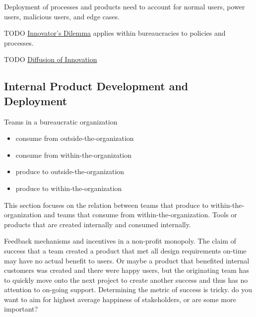 Deployment of processes and products need to account for 
normal users, power users, malicious users, and edge cases.

TODO
\href{https://en.m.wikipedia.org/wiki/The_Innovator's_Dilemma}{Innovator's Dilemma} applies within bureaucracies to policies and processes.

TODO
\href{https://en.wikipedia.org/wiki/Diffusion_of_innovations}{Diffusion of Innovation}



\subsection*{Internal Product Development and Deployment\label{sec:internal-product}}

Teams in a bureaucratic organization 
\begin{itemize}
    \item consume from outside-the-organization
    \item consume from within-the-organization
    \item produce to outside-the-organization
    \item produce to within-the-organization
\end{itemize}

This section focuses on the relation between teams that produce to within-the-organization and teams that consume from within-the-organization. Tools or products that are created internally and consumed internally.

Feedback mechanisms and incentives in a non-profit monopoly. The claim of success that a team created a product that met all design requirements on-time may have no actual benefit to users. Or maybe a product that benefited internal customers was created and there were happy users, but the originating team has to quickly move onto the next project to create another success and thus has no attention to on-going support. Determining the metric of success is tricky. do you want to aim for highest average happiness of stakeholders, or are some more important?

